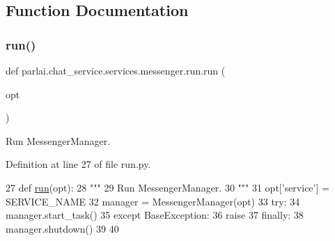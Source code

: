 \subsection{Function Documentation}
\mbox{\label{namespaceparlai_1_1chat__service_1_1services_1_1messenger_1_1run_ac422f71a04fc8363a81107c148e9ece2}} 
\subsubsection{\texorpdfstring{run()}{run()}}
{\footnotesize\ttfamily def parlai.\+chat\+\_\+service.\+services.\+messenger.\+run.\+run (\begin{DoxyParamCaption}\item[{}]{opt }\end{DoxyParamCaption})}

\begin{DoxyVerb}Run MessengerManager.
\end{DoxyVerb}
 

Definition at line 27 of file run.\+py.


\begin{DoxyCode}
27 \textcolor{keyword}{def }\hyperlink{namespaceparlai_1_1tasks_1_1talkthewalk_1_1run_a0a1ec08b8196cb008e4df83468c67e5b}{run}(opt):
28     \textcolor{stringliteral}{"""}
29 \textcolor{stringliteral}{    Run MessengerManager.}
30 \textcolor{stringliteral}{    """}
31     opt[\textcolor{stringliteral}{'service'}] = SERVICE\_NAME
32     manager = MessengerManager(opt)
33     \textcolor{keywordflow}{try}:
34         manager.start\_task()
35     \textcolor{keywordflow}{except} BaseException:
36         \textcolor{keywordflow}{raise}
37     \textcolor{keywordflow}{finally}:
38         manager.shutdown()
39 
40 
\end{DoxyCode}
\mbox{\label{namespaceparlai_1_1chat__service_1_1services_1_1messenger_1_1run_a17bafea2534d593de1fbf1e0724e5b67}} 
